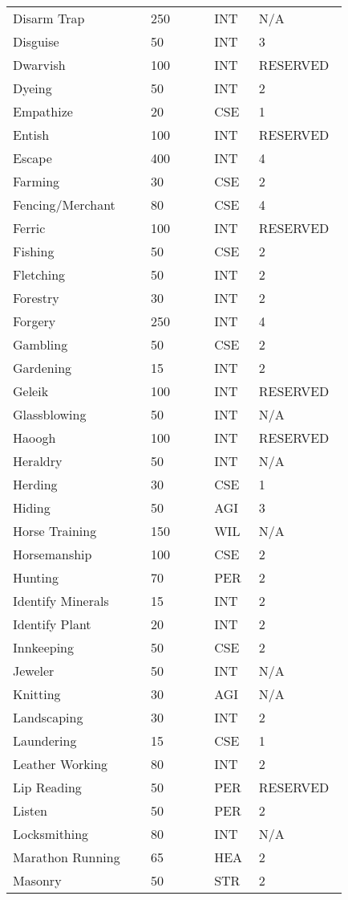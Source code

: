 \documentclass{article}
\begin{document}
\begin{longtable}{@{}p{0.375\linewidth} p{0.178\linewidth} p{0.1\linewidth} p{0.178\linewidth}}
Disarm Trap & 250 & INT & N/A \\
Disguise & 50 & INT & 3 \\
Dwarvish & 100 & INT & RESERVED \\
Dyeing & 50 & INT & 2 \\
Empathize & 20 & CSE & 1 \\
Entish & 100 & INT & RESERVED \\
Escape & 400 & INT & 4 \\
Farming & 30 & CSE & 2 \\
Fencing/Merchant & 80 & CSE & 4 \\
Ferric & 100 & INT & RESERVED \\
Fishing & 50 & CSE & 2 \\
Fletching & 50 & INT & 2 \\
Forestry & 30 & INT & 2 \\
Forgery & 250 & INT & 4 \\
Gambling & 50 & CSE & 2 \\
Gardening & 15 & INT & 2 \\
Geleik & 100 & INT & RESERVED \\
Glassblowing & 50 & INT & N/A \\
Haoogh & 100 & INT & RESERVED \\
Heraldry & 50 & INT & N/A \\
Herding & 30 & CSE & 1 \\
Hiding & 50 & AGI & 3 \\
Horse Training & 150 & WIL & N/A \\
Horsemanship & 100 & CSE & 2 \\
Hunting & 70 & PER & 2 \\
Identify Minerals & 15 & INT & 2 \\
Identify Plant & 20 & INT & 2 \\
Innkeeping & 50 & CSE & 2 \\
Jeweler & 50 & INT & N/A \\
Knitting & 30 & AGI & N/A \\
Landscaping & 30 & INT & 2 \\
Laundering & 15 & CSE & 1 \\
Leather Working & 80 & INT & 2 \\
Lip Reading & 50 & PER & RESERVED \\
Listen & 50 & PER & 2 \\
Locksmithing & 80 & INT & N/A \\
Marathon Running & 65 & HEA & 2 \\
Masonry & 50 & STR & 2 \\

\end{longtable}
\end{document}
